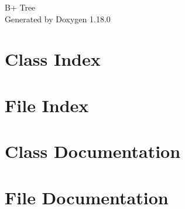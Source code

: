 \documentclass[twoside]{book}
\newcommand{\+}{\discretionary{\mbox{\scriptsize$\hookleftarrow$}}{}{}}
\newcommand{\clearemptydoublepage}{%
    \newpage{\pagestyle{empty}\cleardoublepage}%
  }
\begin{document}
  \raggedbottom
    \hypersetup{pageanchor=false,
                bookmarksnumbered=true,
                pdfencoding=unicode
               }
  \begin{titlepage}
  \vspace*{7cm}
  \begin{center}%
  {\Large B+ Tree}\\
  \vspace*{1cm}
  {\large Generated by Doxygen 1.18.0}\\
  \end{center}
  \end{titlepage}
  \clearemptydoublepage
  \tableofcontents
  \clearemptydoublepage
  \hypersetup{pageanchor=true}
\chapter{Class Index}

\chapter{File Index}

\chapter{Class Documentation}


\chapter{File Documentation}





  \backmatter
  \newpage
  \clearemptydoublepage
  \printindex
\end{document}
